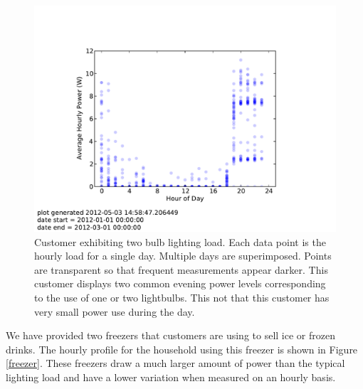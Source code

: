 \documentclass[conference]{IEEEtran}
\begin{document}
\begin{figure}[h]
\begin{center}
\includegraphics[trim = 0.7in 0.8in 0.7in 1.1in, clip, width=\columnwidth]
{figures/two_bulb_profile.pdf}
\end{center}
\caption{Customer exhibiting two bulb lighting load.
Each data point is the hourly load for a single day.
Multiple days are superimposed.
Points are transparent so that frequent measurements appear darker.
This customer displays two common evening power levels corresponding
to the use of one or two lightbulbs.
This not that this customer has very small power use during the day.}
\label{two-bulb-profile}
\end{figure}

We have provided two freezers that customers are using to
sell ice or frozen drinks.
The hourly profile for the household using this freezer
is shown in Figure \ref{freezer}.
These freezers draw a much larger amount of power than the
typical lighting load and have a lower variation when measured
on an hourly basis.
\end{document}
